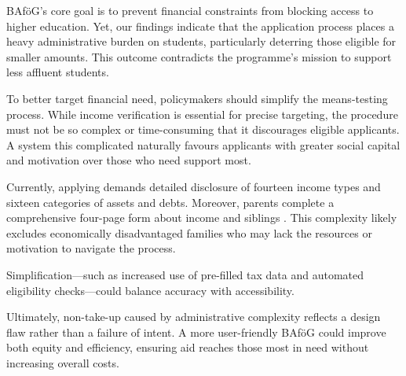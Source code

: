 BAföG’s core goal is to prevent financial constraints from blocking access to higher education. Yet, our findings indicate that the application process places a heavy administrative burden on students, particularly deterring those eligible for smaller amounts. This outcome contradicts the programme’s mission to support less affluent students.

To better target financial need, policymakers should simplify the means-testing process. While income verification is essential for precise targeting, the procedure must not be so complex or time-consuming that it discourages eligible applicants. A system this complicated naturally favours applicants with greater social capital and motivation over those who need support most.

Currently, applying demands detailed disclosure of fourteen income types and sixteen categories of assets and debts. Moreover, parents complete a comprehensive four-page form about income and siblings \citep{fidan_why_2021}. This complexity likely excludes economically disadvantaged families who may lack the resources or motivation to navigate the process.

Simplification—such as increased use of pre-filled tax data and automated eligibility checks—could balance accuracy with accessibility.

Ultimately, non-take-up caused by administrative complexity reflects a design flaw rather than a failure of intent. A more user-friendly BAföG could improve both equity and efficiency, ensuring aid reaches those most in need without increasing overall costs.



%
%


%
%


